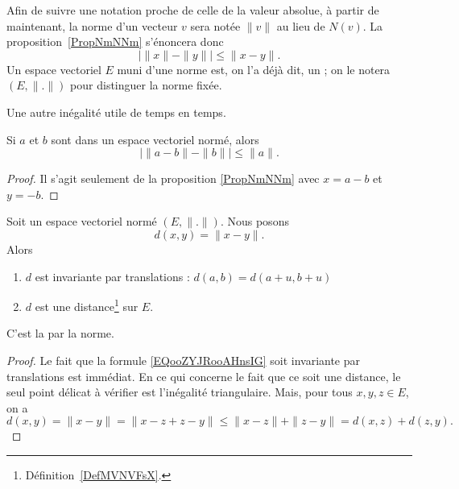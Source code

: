 \begin{normaltext}	
Afin de suivre une notation proche de celle de la valeur absolue, à partir de maintenant, la norme d'un vecteur $v$ sera notée $\| v\|$ au lieu de $N(v)$. La proposition~\ref{PropNmNNm} s'énoncera donc
\begin{equation}
\big| \| x \|-\| y \| \big|\leq \| x-y \|.
\end{equation}
Un espace vectoriel $E$ muni d'une norme est, on l'a déjà dit, un ; on le notera $(E,\| . \|)$ pour distinguer la norme fixée.
\end{normaltext}

Une autre inégalité utile de temps en temps.
\begin{corollary}       \label{CORooDFBGooAqVRfS}
    Si \( a\) et \( b\) sont dans un espace vectoriel normé, alors
    \begin{equation}
        \big| \| a-b \|-\| b \| \big|\leq \| a \|.
    \end{equation}
\end{corollary}

\begin{proof}
    Il s'agit seulement de la proposition \ref{PropNmNNm} avec \( x=a-b\) et \( y=-b\).
\end{proof}

\begin{lemmaDef}        \label{LEMooWGBJooYTDYIK}
    Soit un espace vectoriel normé \( (E,\| . \|)\). Nous posons
    \begin{equation}        \label{EQooZYJRooAHnsIG}
        d(x,y)=\| x-y \| .
    \end{equation}
    Alors
    \begin{enumerate}
        \item       \label{ITEMooLITDooPeReOk}
            \( d\) est invariante par translations : $d(a,b)=d(a+u,b+u)$
        \item
            \( d\) est une distance\footnote{Définition~\ref{DefMVNVFsX}.} sur \( E\).
    \end{enumerate}
    C'est la  par la norme.
\end{lemmaDef}

\begin{proof}
    Le fait que la formule \eqref{EQooZYJRooAHnsIG} soit invariante par translations est immédiat. En ce qui concerne le fait que ce soit une distance, le seul point délicat à vérifier est l'inégalité triangulaire. Mais, pour tous \( x, y, z \in E\), on a
    \begin{equation}
            d(x,y)=\| x-y \| = \| x-z+z-y \|  \leq\| x - z \|+\| z - y\| =d(x,z)+d(z,y).
    \end{equation}
\end{proof}


